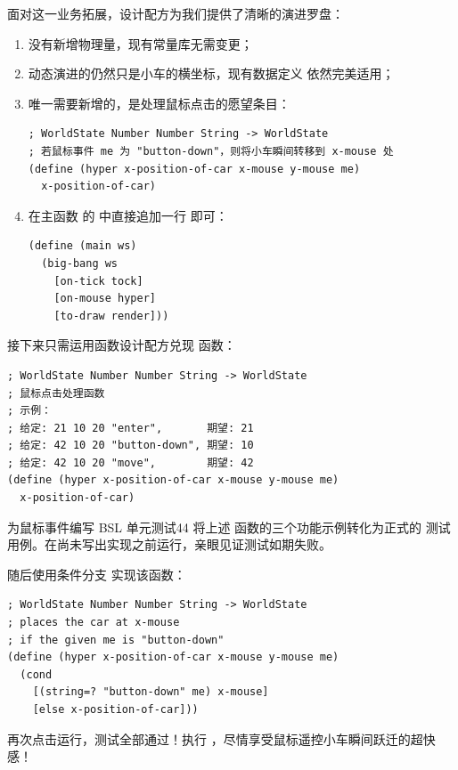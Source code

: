 面对这一业务拓展，设计配方为我们提供了清晰的演进罗盘：
\begin{enumerate}
  \item 没有新增物理量，现有常量库无需变更；
  \item 动态演进的仍然只是小车的横坐标，现有数据定义  依然完美适用；
  \item 唯一需要新增的，是处理鼠标点击的愿望条目：
\begin{lstlisting}[language=BSL]
; WorldState Number Number String -> WorldState
; 若鼠标事件 me 为 "button-down"，则将小车瞬间转移到 x-mouse 处
(define (hyper x-position-of-car x-mouse y-mouse me)
  x-position-of-car)
\end{lstlisting}
  \item 在主函数  的  中直接追加一行  即可：
\begin{lstlisting}[language=BSL]
(define (main ws)
  (big-bang ws
    [on-tick tock]
    [on-mouse hyper]
    [to-draw render]))
\end{lstlisting}
\end{enumerate}

接下来只需运用函数设计配方兑现  函数：
\begin{lstlisting}[language=BSL]
; WorldState Number Number String -> WorldState
; 鼠标点击处理函数
; 示例：
; 给定: 21 10 20 "enter",       期望: 21
; 给定: 42 10 20 "button-down", 期望: 10
; 给定: 42 10 20 "move",        期望: 42
(define (hyper x-position-of-car x-mouse y-mouse me)
  x-position-of-car)
\end{lstlisting}

\begin{exercise}{为鼠标事件编写 BSL 单元测试}{44}
将上述  函数的三个功能示例转化为正式的  测试用例。在尚未写出实现之前运行，亲眼见证测试如期失败。
\end{exercise}

随后使用条件分支  实现该函数：
\begin{lstlisting}[language=BSL, basicstyle=\scriptsize\ttfamily]
; WorldState Number Number String -> WorldState
; places the car at x-mouse
; if the given me is "button-down"
(define (hyper x-position-of-car x-mouse y-mouse me)
  (cond
    [(string=? "button-down" me) x-mouse]
    [else x-position-of-car]))
\end{lstlisting}
再次点击运行，测试全部通过！执行 ，尽情享受鼠标遥控小车瞬间跃迁的超快感！


